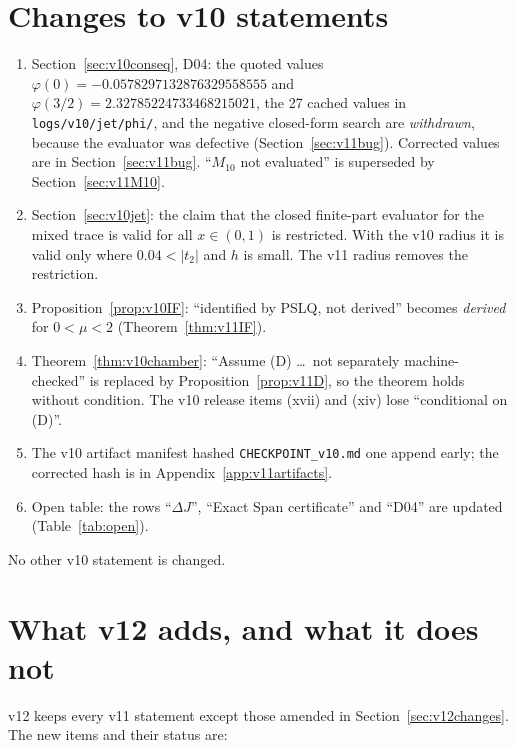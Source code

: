 \documentclass[11pt,a4paper]{article}
\newcommand{\loc}[1]{\nolinkurl{#1}}
\newcommand{\Span}{\mathrm{Span}}
\theoremstyle{plain}
\theoremstyle{definition}
\theoremstyle{remark}
\numberwithin{equation}{section}
\begin{document}
\section{Changes to v10 statements}
\label{sec:v11changes}

\begin{enumerate}[label=(C\arabic*)]
\item Section~\ref{sec:v10conseq}, D04: the quoted values
\(\varphi(0)=-0.0578297132876329558555\) and
\(\varphi(3/2)=2.32785224733468215021\), the 27 cached values in
\loc{logs/v10/jet/phi/}, and the negative closed-form search are
\emph{withdrawn}, because the evaluator was defective
(Section~\ref{sec:v11bug}). Corrected values are in
Section~\ref{sec:v11bug}. ``\(M_{10}\) not evaluated'' is superseded
by Section~\ref{sec:v11M10}.
\item Section~\ref{sec:v10jet}: the claim that the closed
finite-part evaluator for the mixed trace is valid for all
\(x\in(0,1)\) is restricted. With the v10 radius it is valid only
where \(0.04<|t_2|\) and \(h\) is small. The v11 radius removes the
restriction.
\item Proposition~\ref{prop:v10IF}: ``identified by PSLQ, not
derived'' becomes \emph{derived} for \(0<\mu<2\)
(Theorem~\ref{thm:v11IF}).
\item Theorem~\ref{thm:v10chamber}: ``Assume (D) \dots\ not separately
machine-checked'' is replaced by Proposition~\ref{prop:v11D}, so the
theorem holds without condition. The v10 release items (xvii) and
(xiv) lose ``conditional on (D)''.
\item The v10 artifact manifest hashed \loc{CHECKPOINT_v10.md} one
append early; the corrected hash is in
Appendix~\ref{app:v11artifacts}.
\item Open table: the rows ``\(\Delta J\)'', ``Exact \(\Span\)
certificate'' and ``D04'' are updated (Table~\ref{tab:open}).
\end{enumerate}
No other v10 statement is changed.

\section{What v12 adds, and what it does not}
\label{sec:whatv12}

v12 keeps every v11 statement \cite{CheungConeV11} except those
amended in Section~\ref{sec:v12changes}. The new items and their
status are:
\end{document}
